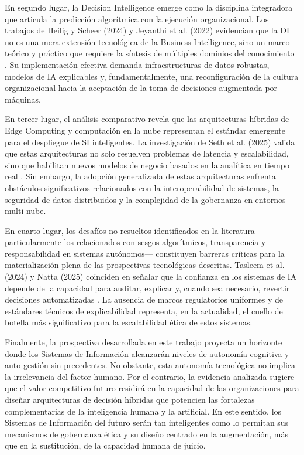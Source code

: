 \documentclass[conference]{IEEEtran}
\begin{document}
En segundo lugar, la Decision Intelligence emerge como la disciplina integradora que articula la predicción algorítmica con la ejecución organizacional. Los trabajos de Heilig y Scheer (2024) y Jeyanthi et al. (2022) evidencian que la DI no es una mera extensión tecnológica de la Business Intelligence, sino un marco teórico y práctico que requiere la síntesis de múltiples dominios del conocimiento \cite{heilig2024, jeyanthi2022}. Su implementación efectiva demanda infraestructuras de datos robustas, modelos de IA explicables y, fundamentalmente, una reconfiguración de la cultura organizacional hacia la aceptación de la toma de decisiones augmentada por máquinas.

En tercer lugar, el análisis comparativo revela que las arquitecturas híbridas de Edge Computing y computación en la nube representan el estándar emergente para el despliegue de SI inteligentes. La investigación de Seth et al. (2025) valida que estas arquitecturas no solo resuelven problemas de latencia y escalabilidad, sino que habilitan nuevos modelos de negocio basados en la analítica en tiempo real \cite{seth2025}. Sin embargo, la adopción generalizada de estas arquitecturas enfrenta obstáculos significativos relacionados con la interoperabilidad de sistemas, la seguridad de datos distribuidos y la complejidad de la gobernanza en entornos multi-nube.

En cuarto lugar, los desafíos no resueltos identificados en la literatura —particularmente los relacionados con sesgos algorítmicos, transparencia y responsabilidad en sistemas autónomos— constituyen barreras críticas para la materialización plena de las prospectivas tecnológicas descritas. Tasleem et al. (2024) y Natta (2025) coinciden en señalar que la confianza en los sistemas de IA depende de la capacidad para auditar, explicar y, cuando sea necesario, revertir decisiones automatizadas \cite{tasleem2024, natta2025}. La ausencia de marcos regulatorios uniformes y de estándares técnicos de explicabilidad representa, en la actualidad, el cuello de botella más significativo para la escalabilidad ética de estos sistemas.

Finalmente, la prospectiva desarrollada en este trabajo proyecta un horizonte donde los Sistemas de Información alcanzarán niveles de autonomía cognitiva y auto-gestión sin precedentes. No obstante, esta autonomía tecnológica no implica la irrelevancia del factor humano. Por el contrario, la evidencia analizada sugiere que el valor competitivo futuro residirá en la capacidad de las organizaciones para diseñar arquitecturas de decisión híbridas que potencien las fortalezas complementarias de la inteligencia humana y la artificial. En este sentido, los Sistemas de Información del futuro serán tan inteligentes como lo permitan sus mecanismos de gobernanza ética y su diseño centrado en la augmentación, más que en la sustitución, de la capacidad humana de juicio.
\end{document}
